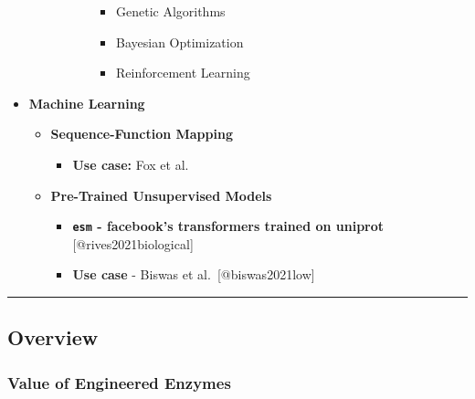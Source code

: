 \begin{itemize}
\begin{itemize}
\begin{itemize}
\begin{itemize}
        \begin{itemize}
        \tightlist
        \item
          Genetic Algorithms
        \item
          Bayesian Optimization
        \item
          Reinforcement Learning
        \end{itemize}
      \end{itemize}
    \end{itemize}
  \end{itemize}
\item
  \textbf{Machine Learning}

  \begin{itemize}
  \tightlist
  \item
    \textbf{Sequence-Function Mapping}

    \begin{itemize}
    \tightlist
    \item
      \textbf{Use case:} Fox et al.
    \end{itemize}
  \item
    \textbf{Pre-Trained Unsupervised Models}

    \begin{itemize}
    \tightlist
    \item
      \textbf{\texttt{esm} - facebook's transformers trained on uniprot}
      {[}@rives2021biological{]}
    \item
      \textbf{Use case} - Biswas et al.~{[}@biswas2021low{]}
    \end{itemize}
  \end{itemize}
\end{itemize}

\begin{center}\rule{0.5\linewidth}{0.5pt}\end{center}

\hypertarget{overview-2}{%
\subsection{Overview}\label{overview-2}}

\hypertarget{value-of-engineered-enzymes}{%
\subsubsection{Value of Engineered
Enzymes}\label{value-of-engineered-enzymes}}

